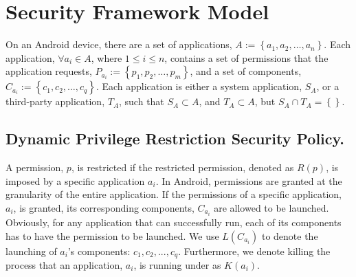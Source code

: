 \section{Security Framework Model}



On an Android device, there are a set of applications, $A :=
\left\{a_{1},a_{2},\ldots,a_{n}\right\}$.  Each application, $\forall a_{i} \in
A$, where $1 \le i \le n$, contains a set of permissions that the application
requests, $P_{a_{i}} := \left\{p_{1}, p_{2},\ldots,p_{m}\right\}$, and a set of
components, $C_{a_{i}} := \left\{c_{1},c_{2},\ldots,c_{q}\right\}$.  Each
application is either a system application, $S_{A}$, or a third-party
application, $T_{A}$, such that $S_{A}\subset A$, and $T_{A} \subset A$, but
$S_{A} \cap T_{A} = \left\{\right\}$.

\subsection{Dynamic Privilege Restriction Security Policy.}  

A permission, $p$, is restricted if the restricted permission, denoted as
$R\left(p\right)$, is imposed by a specific application $a_{i}$.
In Android, permissions are granted at the granularity of the entire
application.  If the permissions of a specific application, $a_i$, is granted,
its corresponding components, $C_{a_i}$ are allowed to be launched. Obviously,
for any application that can successfully run, each of its components has to
have the permission to be launched. We use $L(C_{a_i})$ to denote the launching
of $a_i$'s components: $c_1, c_2,...,c_q$.
%
Furthermore, we denote killing the process that an application, $a_{i}$, is
running under as $K(a_{i})$.

